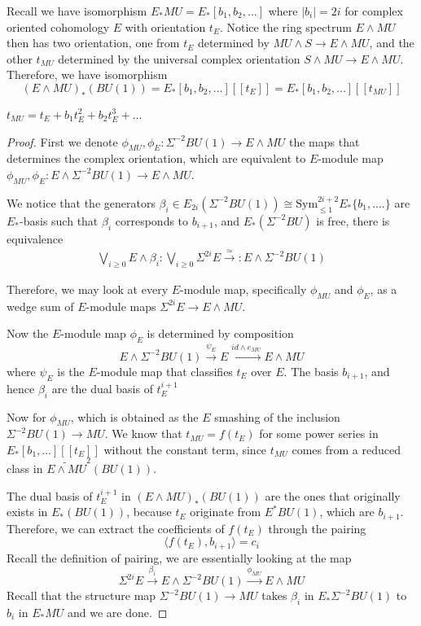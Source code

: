 Recall we have isomorphism $E_*MU=E_*[b_1,b_2,...]$ where $|b_i|=2i$ for complex oriented cohomology $E$ with orientation $t_E$. Notice the ring spectrum $E\wedge MU$ then has two orientation, one from $t_E$ determined by $MU\wedge S\to E\wedge MU$, and the other $t_{MU}$ determined by the universal complex orientation $S\wedge MU\to E\wedge MU$. Therefore, we have isomorphism
\[
(E\wedge MU)_*(BU(1))=E_*[b_1,b_2,...][[t_E]]=E_*[b_1,b_2,...][[t_{MU}]]
\]
\begin{lemma}
  \cite{ChrLurie}  $t_{MU}=t_E+b_1t_E^2+b_2t_E^3+...$
\end{lemma}
\begin{proof}
    First we denote $\phi_{MU}, \phi_E:\Sigma^{-2}BU(1)\to E\wedge MU$  the maps that determines the complex orientation, which are equivalent to $E$-module map $\phi_{MU}, \phi_E: E\wedge \Sigma^{-2}BU(1)\to E\wedge MU$.

    We notice that the generators $\beta_i\in E_{2i}(\Sigma^{-2}BU(1))\cong \mathrm{Sym}^{2i+2}_{\leq 1}E_*\{b_1,....\}$ are $E_*$-basis such that $\beta_i$ corresponds to $b_{i+1}$, and $E_{*}(\Sigma^{-2}BU)$ is free, there is equivalence
    \begin{align*}
     \bigvee_{i\geq 0}E\wedge \beta_i:\bigvee_{i\geq 0} \Sigma^{2i}E \xrightarrow{\simeq}:E\wedge  \Sigma^{-2}BU(1)
    \end{align*}

    Therefore, we may look at every $E$-module map, specifically $\phi_{MU}$ and $\phi_E$, as a wedge sum of $E$-module maps $\Sigma^{2i}E\to E\wedge MU$.

    Now the $E$-module map $\phi_E$ is determined by composition
    \[
    E\wedge \Sigma^{-2}BU(1)\xrightarrow{\psi_E}E\xrightarrow{id\wedge e_{MU}}E\wedge MU
    \]where $\psi_E$ is the $E$-module map that classifies $t_E$ over $E$. The basis $b_{i+1}$, and hence $\beta_i$ are the dual basis of $t_E^{i+1}$
    
    Now for $\phi_{MU}$, which is obtained as the $E$ smashing of the inclusion $\Sigma^{-2}BU(1)\to MU$. We know that $t_{MU}=f(t_E)$ for some power series in $E_*[b_1,...][[t_E]]$ without the constant term, since $t_{MU}$ comes from a reduced class in $\tilde{E\wedge MU}^2(BU(1))$.
    
    The dual basis of $t_E^{i+1}$ in $(E\wedge MU)_*(BU(1))$ are the ones that originally exists in $E_*(BU(1))$, because $t_E$ originate from $E^*BU(1)$, which are $b_{i+1}$. Therefore, we can extract the coefficients of $f(t_E)$ through the pairing
\[
\langle f(t_E), b_{i+1}\rangle=c_{i}
\]
    Recall the definition of pairing, we are essentially looking at the map
    \[
    \Sigma^{2i}E\xrightarrow{\beta_{i}} E\wedge \Sigma^{-2}BU(1)\xrightarrow{\phi_{MU}}E\wedge MU
    \]
    Recall that the structure map $\Sigma^{-2}BU(1)\to MU$ takes $\beta_i$ in $E_*\Sigma^{-2}BU(1)$ to $b_i$ in $E_*MU$ and we are done.
\end{proof}

